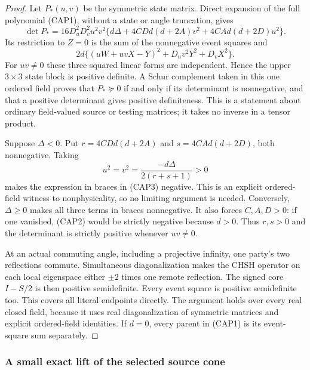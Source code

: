 \begin{proof}
Let $P_*(u,v)$ be the symmetric state matrix.  Direct expansion of the
full polynomial (CAP1), without a state or angle truncation, gives
\[
\det P_*=16D_u^2D_v^2u^2v^2
 \{d\Delta+4CDd(d+2A)v^2+4CAd(d+2D)u^2\}.
\tag{CAP3}
\]
Its restriction to $Z=0$ is the sum of the
nonnegative event squares and
\[
2d\{(uW+uvX-Y)^2+D_uv^2Y^2+D_vX^2\}.
\tag{CAP4}
\]
For $uv\ne0$ these three squared linear forms are independent.  Hence
the upper $3\times3$ state block is positive definite.  A Schur
complement taken in this one ordered field proves that $P_*\succeq0$
if and only if its determinant is nonnegative, and that a positive
determinant gives positive definiteness.  This is a statement about
ordinary field-valued source or testing matrices; it takes no inverse
in a tensor product.

Suppose $\Delta<0$.  Put $r=4CDd(d+2A)$ and
$s=4CAd(d+2D)$, both nonnegative.  Taking
\[
u^2=v^2=\frac{-d\Delta}{2(r+s+1)}>0
\]
makes the expression in braces in (CAP3) negative.  This is an explicit
ordered-field witness to nonphysicality, so no limiting argument is
needed.  Conversely, $\Delta\geq0$ makes all three terms in braces
nonnegative.  It also forces $C,A,D>0$: if one vanished, (CAP2) would
be strictly negative because $d>0$.  Thus $r,s>0$ and the determinant
is strictly positive whenever $uv\ne0$.

At an actual commuting angle, including a projective infinity, one
party's two reflections commute.  Simultaneous diagonalization makes
the CHSH operator on each local eigenspace either $\pm2$ times one
remote reflection.  The signed core $I-S/2$ is then positive
semidefinite.  Every event square is positive semidefinite too.  This
covers all literal endpoints directly.  The argument holds over every
real closed field, because it uses real diagonalization of symmetric
matrices and explicit ordered-field identities.  If $d=0$, every
parent in (CAP1) is its event-square sum separately.
\end{proof}

\subsubsection*{A small exact lift of the selected source cone}

